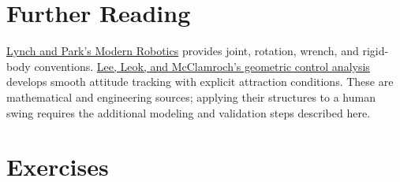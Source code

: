 \section{Further Reading}

\href{https://hades.mech.northwestern.edu/images/2/25/MR-v2.pdf}{Lynch and Park's
Modern Robotics} provides joint, rotation, wrench, and rigid-body conventions.
\href{https://arxiv.org/abs/1003.2005}{Lee, Leok, and McClamroch's geometric
control analysis} develops smooth attitude tracking with explicit attraction
conditions. These are mathematical and engineering sources; applying their
structures to a human swing requires the additional modeling and validation
steps described here.

\section{Exercises}

